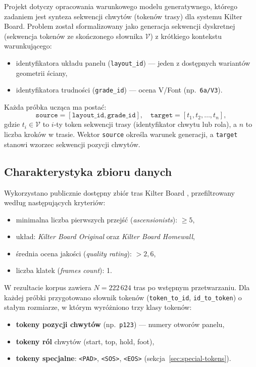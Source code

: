 \documentclass[12pt,a4paper]{article}
\begin{document}
Projekt dotyczy opracowania warunkowego modelu generatywnego, którego zadaniem jest synteza sekwencji chwytów (tokenów trasy) dla systemu Kilter Board. Problem został sformalizowany jako generacja sekwencji dyskretnej (sekwencja tokenów ze skończonego słownika $\mathcal{V}$) z krótkiego kontekstu warunkującego:
\begin{itemize}[leftmargin=1.5em]
    \item identyfikatora układu panelu (\texttt{layout\_id}) --- jeden z dostępnych wariantów geometrii ściany,
    \item identyfikatora trudności (\texttt{grade\_id}) --- ocena V/Font (np.\ \texttt{6a/V3}).
\end{itemize}
Każda próbka ucząca ma postać:
\begin{equation}
\texttt{source} = [\texttt{layout\_id}, \texttt{grade\_id}], \quad
\texttt{target} = [t_1, t_2, \dots, t_n],
\end{equation}
gdzie $t_i \in \mathcal{V}$ to $i$-ty token sekwencji trasy (identyfikator chwytu lub rola), a $n$ to liczba kroków w trasie. Wektor \texttt{source} określa warunek generacji, a \texttt{target} stanowi wzorzec sekwencji pozycji chwytów.

\subsection{Charakterystyka zbioru danych}
\label{sec:dataset}

Wykorzystano publicznie dostępny zbiór tras Kilter Board \citep{kilterdataset}, przefiltrowany według następujących kryteriów:
\begin{itemize}[leftmargin=1.5em]
    \item minimalna liczba pierwszych przejść (\textit{ascensionists}): $\ge 5$,
    \item układ: \textit{Kilter Board Original} oraz \textit{Kilter Board Homewall},
    \item średnia ocena jakości (\textit{quality rating}): $> 2{,}6$,
    \item liczba klatek (\textit{frames count}): 1.
\end{itemize}
W rezultacie korpus zawiera \(N = 222\,624\) tras po wstępnym przetwarzaniu. Dla każdej próbki przygotowano słownik tokenów (\texttt{token\_to\_id}, \texttt{id\_to\_token}) o stałym rozmiarze, w którym wyróżniono trzy klasy tokenów:
\begin{itemize}[leftmargin=1.5em]
    \item \textbf{tokeny pozycji chwytów} (np.\ \texttt{p123}) --- numery otworów panelu,
    \item \textbf{tokeny ról} chwytów (start, top, hold, foot),
    \item \textbf{tokeny specjalne}: \texttt{<PAD>}, \texttt{<SOS>}, \texttt{<EOS>} (sekcja~\ref{sec:special-tokens}).
\end{itemize}
\end{document}
